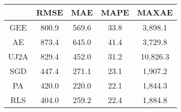 \begin{tabular}{ccccc}
\toprule
{} &   RMSE &    MAE &  MAPE &     MAXAE \\
\midrule
GEE  &  800.9 &  569.6 &  33.8 &   3,898.1 \\
AE   &  873.4 &  645.0 &  41.4 &   3,729.8 \\
UJ2A &  829.4 &  452.0 &  31.2 &  10,826.3 \\
SGD  &  447.4 &  271.1 &  23.1 &   1,907.2 \\
PA   &  420.0 &  220.0 &  22.1 &   1,844.3 \\
RLS  &  404.0 &  259.2 &  22.4 &   1,884.8 \\
\bottomrule
\end{tabular}
